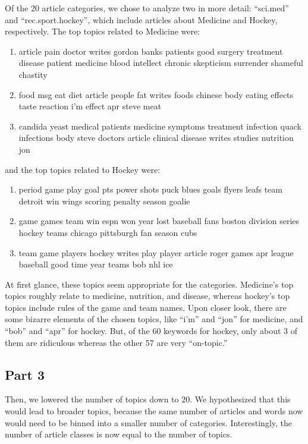 Of the 20 article categories, we chose to analyze two in more detail: ``sci.med'' and ``rec.sport.hockey'', which include articles about Medicine and Hockey, respectively.
The top topics related to Medicine were:
\begin{enumerate}
	\item article pain doctor writes gordon banks patients good surgery treatment disease patient medicine blood intellect chronic skepticism surrender shameful chastity
	\item food msg eat diet article people fat writes foods chinese body eating effects taste reaction i'm effect apr steve meat
	\item candida yeast medical patients medicine symptoms treatment infection quack infections body steve doctors article clinical disease writes studies nutrition jon
\end{enumerate}
and the top topics related to Hockey were:
\begin{enumerate}
	\item period game play goal pts power shots puck blues goals flyers leafs team detroit win wings scoring penalty season goalie
	\item game games team win espn won year lost baseball fans boston division series hockey teams chicago pittsburgh fan season cubs
	\item team game players hockey writes play player article roger games apr league baseball good time year teams bob nhl ice 
\end{enumerate}
At first glance, these topics seem appropriate for the categories.
Medicine's top topics roughly relate to medicine, nutrition, and disease, whereas hockey's top topics include rules of the game and team names.
Upon closer look, there are some bizarre elements of the chosen topics, like ``i'm'' and ``jon'' for medicine, and ``bob'' and ``apr'' for hockey.
But, of the 60 keywords for hockey, only about 3 of them are ridiculous whereas the other 57 are very ``on-topic.''

\subsection{Part 3}
Then, we lowered the number of topics down to 20.
We hypothesized that this would lead to broader topics, because the same number of articles and words now would need to be binned into a smaller number of categories.
Interestingly, the number of article classes is now equal to the number of topics.

